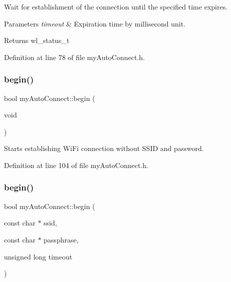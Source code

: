 Wait for establishment of the connection until the specified time expires. 
\begin{DoxyParams}{Parameters}
{\em timeout} & Expiration time by millisecond unit. \\
\hline
\end{DoxyParams}
\begin{DoxyReturn}{Returns}
wl\+\_\+status\+\_\+t 
\end{DoxyReturn}


Definition at line 78 of file my\+Auto\+Connect.\+h.

\mbox{\label{classmy_auto_connect_aeb57ccef1c16394c297a2ea2fd143f52}} 
\subsubsection{\texorpdfstring{begin()}{begin()}\hspace{0.1cm}{\footnotesize\ttfamily [1/2]}}
{\footnotesize\ttfamily bool my\+Auto\+Connect\+::begin (\begin{DoxyParamCaption}\item[{void}]{ }\end{DoxyParamCaption})\hspace{0.3cm}{\ttfamily [inline]}}

Starts establishing Wi\+Fi connection without S\+S\+ID and password. 

Definition at line 104 of file my\+Auto\+Connect.\+h.

\mbox{\label{classmy_auto_connect_a1e452b4042120cda55722dc3bf220a77}} 
\subsubsection{\texorpdfstring{begin()}{begin()}\hspace{0.1cm}{\footnotesize\ttfamily [2/2]}}
{\footnotesize\ttfamily bool my\+Auto\+Connect\+::begin (\begin{DoxyParamCaption}\item[{const char $\ast$}]{ssid,  }\item[{const char $\ast$}]{passphrase,  }\item[{unsigned long}]{timeout }\end{DoxyParamCaption})\hspace{0.3cm}{\ttfamily [inline]}}

